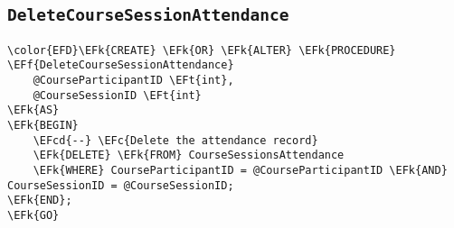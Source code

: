 \documentclass[11pt]{article}
\newcommand{\EFc}[1]{\textcolor{EFc}{\textit{#1}}} %
\newcommand{\EFcd}[1]{\textcolor{EFcd}{\textit{#1}}} %
\newcommand{\EFk}[1]{\textcolor{EFk}{\textbf{#1}}} %
\newcommand{\EFf}[1]{\textcolor{EFf}{#1}} %
\newcommand{\EFt}[1]{\textcolor{EFt}{\textbf{#1}}} %
\begin{document}
\subsection{\texttt{DeleteCourseSessionAttendance}}
\label{sec:org08f4829}

\begin{Code}
\begin{Verbatim}
\color{EFD}\EFk{CREATE} \EFk{OR} \EFk{ALTER} \EFk{PROCEDURE} \EFf{DeleteCourseSessionAttendance}
    @CourseParticipantID \EFt{int},
    @CourseSessionID \EFt{int}
\EFk{AS}
\EFk{BEGIN}
    \EFcd{--} \EFc{Delete the attendance record}
    \EFk{DELETE} \EFk{FROM} CourseSessionsAttendance
    \EFk{WHERE} CourseParticipantID = @CourseParticipantID \EFk{AND} CourseSessionID = @CourseSessionID;
\EFk{END};
\EFk{GO}
\end{Verbatim}
\end{Code}
\end{document}
